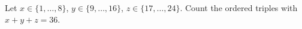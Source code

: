 Let $x\in\{1,\ldots,8\}$, $y\in\{9,\ldots,16\}$, $z\in\{17,\ldots,24\}$. Count the ordered triples with $x+y+z=36$.
